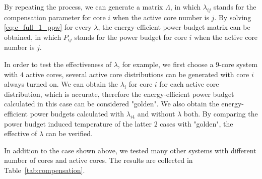 By repeating the process, we can generate a matrix $\Lambda$, in which $\lambda_{ij}$ stands for the compensation parameter for core $i$ when the active core number is $j$. By solving \eqref{eq:c_full_1_ppw} for every $\lambda$, the energy-efficient power budget matrix can be obtained, in which $P_{ij}$ stands for the power budget for core $i$ when the active core number is $j$.

In order to test the effectiveness of $\lambda$, for example, we first choose a $9$-core system with $4$ active cores, several active core distributions can be generated with core $i$ always turned on. We can obtain the $\lambda_{i}$ for core $i$ for each active core distribution, which is accurate, therefore the energy-efficient power budget calculated in this case can be considered "golden". We also obtain the energy-efficient power budgets calculated with $\lambda_{i4}$ and without $\lambda$ both. By comparing the power budget induced temperature of the latter $2$ cases with "golden", the effective of $\lambda$ can be verified.


In addition to the case shown above, we tested many other systems with different number of cores and active cores. The results are collected in Table~\ref{tab:compensation}.


